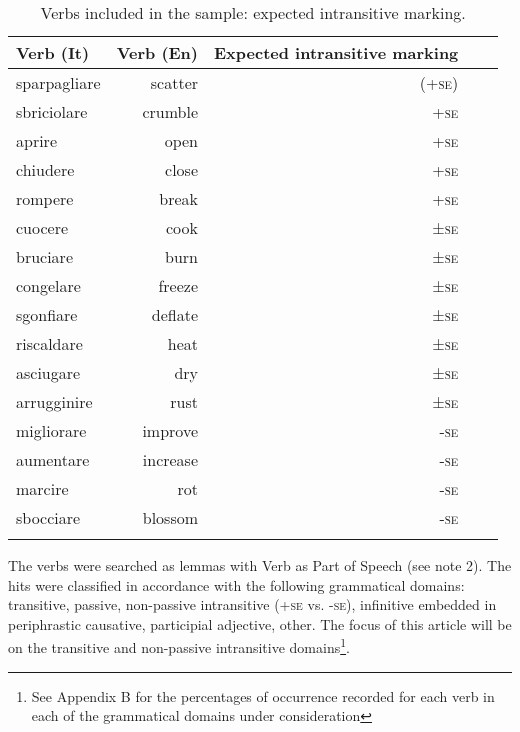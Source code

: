 \documentclass[output=paper,colorlinks,citecolor=brown
]{langscibook}
\begin{document}
\begin{table}[hbt!]
\caption{Verbs included in the sample: expected intransitive marking. }
\label{tab:bentley_table_1}
 \begin{tabularx}{.8\textwidth}{X rrrr}
  \lsptoprule
  Verb (It)  & Verb (En) & Expected intransitive marking \\
  \midrule
sparpagliare & 	scatter	& (+\textsc{se}) \\
sbriciolare &	crumble	& +\textsc{se} \\
aprire 	& open	& +\textsc{se} \\
chiudere &	close	& +\textsc{se} \\
rompere &	break	& +\textsc{se} \\
cuocere &	cook	& ±\textsc{se} \\
bruciare &	burn	& ±\textsc{se} \\
congelare &	freeze	& ±\textsc{se} \\
sgonfiare &	deflate	& ±\textsc{se} \\
riscaldare &	heat	& ±\textsc{se} \\
asciugare &	dry	& ±\textsc{se} \\
arrugginire &	rust	& ±\textsc{se} \\
migliorare &	improve	& -\textsc{se} \\
aumentare &	increase	& -\textsc{se} \\
marcire	& rot	& -\textsc{se} \\
sbocciare &	blossom	& -\textsc{se} \\
  \lspbottomrule
 \end{tabularx}
\end{table}

The verbs were searched as lemmas with Verb as Part of Speech (see note 2). The hits were classified in accordance with the following grammatical domains: transitive, passive, non-passive intransitive (+\textsc{se} vs. -\textsc{se}), infinitive embedded in periphrastic causative, participial adjective, other. The focus of this article will be on the transitive and non-passive intransitive domains\footnote{See Appendix B for the percentages of occurrence recorded for each verb in each of the grammatical domains under consideration}.
\end{document}
